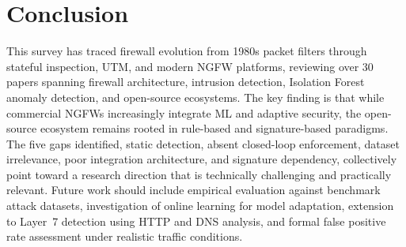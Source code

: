 \documentclass[conference]{IEEEtran}
\begin{document}
\section{Conclusion}
\label{sec:conclusion}

This survey has traced firewall evolution from 1980s packet filters through stateful inspection, UTM, and modern NGFW platforms, reviewing over 30 papers spanning firewall architecture, intrusion detection, Isolation Forest anomaly detection, and open-source ecosystems. The key finding is that while commercial NGFWs increasingly integrate ML and adaptive security, the open-source ecosystem remains rooted in rule-based and signature-based paradigms. The five gaps identified, static detection, absent closed-loop enforcement, dataset irrelevance, poor integration architecture, and signature dependency, collectively point toward a research direction that is technically challenging and practically relevant. Future work should include empirical evaluation against benchmark attack datasets, investigation of online learning for model adaptation, extension to Layer~7 detection using HTTP and DNS analysis, and formal false positive rate assessment under realistic traffic conditions.



\end{document}
